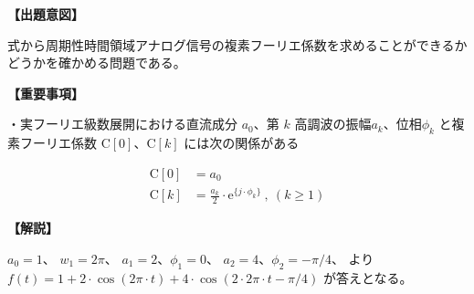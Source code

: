 \noindent \textbf{【出題意図】}

\bigskip
\noindent 式から周期性時間領域アナログ信号の複素フーリエ係数を求めることができるかどうかを確かめる問題である。

\vspace{1em}
\noindent \textbf{【重要事項】}

\medskip
\noindent・実フーリエ級数展開における直流成分 $a_0$、第 $k$ 高調波の振幅$a_k$、位相$\phi_k$ と複素フーリエ係数 $\textrm{C}[0]$、$\textrm{C}[k]$ には次の関係がある

\begin{align*}
\textrm{C}[0] &= a_0 \\
\textrm{C}[k] &= \frac{a_k}{2} \cdot \textrm{e}^{\{j \cdot \phi_k \}} \ ,\ (k\geq 1)
\end{align*}


\bigskip

\vspace{1em}
\noindent \textbf{【解説】}

\bigskip
\noindent 
$a_0 = 1$、
$w_1 = 2 \pi$、
$a_1 = 2$、$\phi_1 = 0$、
$a_2 = 4$、$\phi_2 = -\pi/4$、
より 
$f(t) = 1 + 2 \cdot \cos( 2 \pi \cdot t ) + 4 \cdot \cos( 2 \cdot 2 \pi \cdot t - \pi/4)$ 
が答えとなる。
